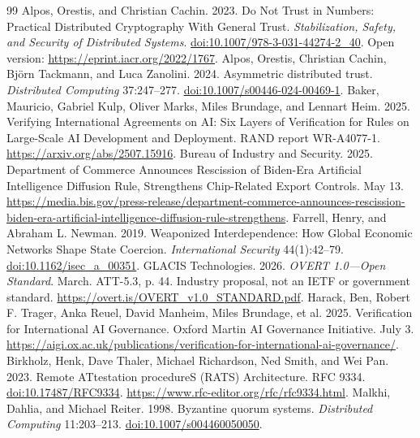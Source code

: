 \documentclass[11pt,letterpaper]{article}
\begin{document}
\begin{thebibliography}{99}
 Alpos, Orestis, and Christian Cachin. 2023. Do Not Trust in Numbers: Practical Distributed Cryptography With General Trust. \emph{Stabilization, Safety, and Security of Distributed Systems}. \href{https://doi.org/10.1007/978-3-031-44274-2_40}{doi:10.1007/978-3-031-44274-2\_40}. Open version: \url{https://eprint.iacr.org/2022/1767}.
 Alpos, Orestis, Christian Cachin, Bj\"orn Tackmann, and Luca Zanolini. 2024. Asymmetric distributed trust. \emph{Distributed Computing} 37:247--277. \href{https://doi.org/10.1007/s00446-024-00469-1}{doi:10.1007/s00446-024-00469-1}.
 Baker, Mauricio, Gabriel Kulp, Oliver Marks, Miles Brundage, and Lennart Heim. 2025. Verifying International Agreements on AI: Six Layers of Verification for Rules on Large-Scale AI Development and Deployment. RAND report WR-A4077-1. \url{https://arxiv.org/abs/2507.15916}.
 Bureau of Industry and Security. 2025. Department of Commerce Announces Rescission of Biden-Era Artificial Intelligence Diffusion Rule, Strengthens Chip-Related Export Controls. May 13. \url{https://media.bis.gov/press-release/department-commerce-announces-rescission-biden-era-artificial-intelligence-diffusion-rule-strengthens}.
 Farrell, Henry, and Abraham L. Newman. 2019. Weaponized Interdependence: How Global Economic Networks Shape State Coercion. \emph{International Security} 44(1):42--79. \href{https://doi.org/10.1162/isec_a_00351}{doi:10.1162/isec\_a\_00351}.
 GLACIS Technologies. 2026. \emph{OVERT 1.0---Open Standard}. March. ATT-5.3, p. 44. Industry proposal, not an IETF or government standard. \url{https://overt.is/OVERT_v1.0_STANDARD.pdf}.
 Harack, Ben, Robert F. Trager, Anka Reuel, David Manheim, Miles Brundage, et al. 2025. Verification for International AI Governance. Oxford Martin AI Governance Initiative. July 3. \url{https://aigi.ox.ac.uk/publications/verification-for-international-ai-governance/}.
 Birkholz, Henk, Dave Thaler, Michael Richardson, Ned Smith, and Wei Pan. 2023. Remote ATtestation procedureS (RATS) Architecture. RFC 9334. \href{https://doi.org/10.17487/RFC9334}{doi:10.17487/RFC9334}. \url{https://www.rfc-editor.org/rfc/rfc9334.html}.
 Malkhi, Dahlia, and Michael Reiter. 1998. Byzantine quorum systems. \emph{Distributed Computing} 11:203--213. \href{https://doi.org/10.1007/s004460050050}{doi:10.1007/s004460050050}.

\end{thebibliography}
\end{document}
